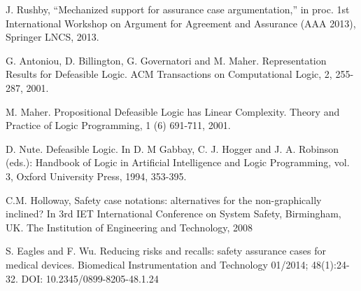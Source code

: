 \documentclass{article} %
\begin{document}
{\begin{thebibliography}{}
 J. Rushby, “Mechanized support for assurance case argumentation,” in
proc. 1st International Workshop on Argument for Agreement and
Assurance (AAA 2013), Springer LNCS, 2013. 

G. Antoniou, D. Billington, G. Governatori and M. Maher. Representation Results for Defeasible Logic. ACM Transactions on Computational Logic, 2, 255-287, 2001.

M. Maher. Propositional Defeasible Logic has Linear Complexity. Theory and Practice of Logic Programming, 1 (6) 691-711, 2001.

D. Nute. Defeasible Logic. In D. M Gabbay, C. J. Hogger and J. A. Robinson (eds.): Handbook of Logic in Artificial Intelligence and Logic Programming, vol. 3, Oxford University Press, 1994, 353-395.


C.M. Holloway,  Safety case notations: alternatives for the non-graphically inclined? In 3rd
IET International Conference on System Safety, Birmingham, UK. The Institution of Engineering
and Technology, 2008

S. Eagles and F. Wu. Reducing risks and recalls: safety assurance cases for medical devices. Biomedical Instrumentation and Technology 01/2014; 48(1):24-32. DOI: 10.2345/0899-8205-48.1.24

\end{thebibliography}
}
\end{document}
